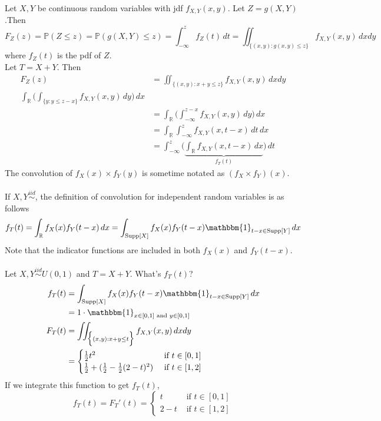 \documentclass[12pt]{article}
\newcommand{\prob}[1]{\mathbb{P}(#1)}
\newcommand{\indicator}[1]{\mathbbm{1}_{#1}}
\newcommand{\iid}{\stackrel{iid}{\sim}}
\newcommand{\set}[1]{\Big\{ #1 \Big\}}
\begin{document}
Let $X, Y$ be continuous random variables with jdf $f_{X, Y}(x,y)$. Let $Z = g(X, Y)$ .Then 
$$F_Z(z) = \prob{Z \leq z} = \prob{g(X, Y) \leq z} = \int_{-\infty}^z f_Z(t) \, dt = \iint_{\set{(x, y) : g(x, y) \leq z}} f_{X, Y}(x, y) \, dxdy $$ where $f_Z(t)$ is the pdf of $Z$. \\ Let $T = X + Y$. Then $$\begin{aligned} F_Z(z) &= \iint_{\set{(x, y): x + y \leq z}} f_{X, Y}(x, y) \, dxdy \\ \int_{\mathbb{R}} \Big( \int_{\set{y: y \leq z -x}} f_{X, Y} (x, y) \, dy\Big) \, dx \\ &= \int_{\mathbb{R}} \Big( \int_{-\infty}^{z - x} f_{X, Y} (x, y) \, dy\Big) \, dx \\ &= \int_{\mathbb{R}} \int_{-\infty}^z f_{X, Y}(x, t - x) \, dt \, dx \\ &= \int_{-\infty}^z \Big( \underbrace{\int_{\mathbb{R}} f_{X, Y} (x, t - x) \, dx}_{f_T(t)}\Big) \, dt \end{aligned} $$ The convolution of $f_X(x) \times f_Y(y)$ is sometime notated as $(f_X \times f_Y)(x)$. \\~\\
If $X, Y \iid$, the definition of convolution for independent random variables is as follows $$f_T(t) = \int_{\mathbb{R}} f_X(x)f_Y(t -x) \, dx = \int_{\text{Supp}[X]} f_X(x)f_Y(t - x) \indicator{t - x \in \text{Supp}[Y]} \, dx $$ Note that the indicator functions are included in both $f_X(x)$ and $f_Y(t - x)$. \\~\\
Let $X, Y \iid U(0, 1)$ and $T = X + Y$. What's $f_T(t)$? $$\begin{aligned} f_T(t) &= \int_{\text{Supp}[X]} f_X(x)f_Y(t - x) \indicator{t - x \in \text{Supp}[Y]} \, dx \\ &= 1 \cdot \indicator{x \in [0, 1] \text{ and } y \in [0, 1]} \\ F_T(t) &= \iint_{\set{(x, y): x + y \leq t}} f_{X, Y} (x, y)\, dxdy \\ &= \begin{cases} \frac{1}{2}t^2 &\text{ if } t \in [0, 1] \\ \frac{1}{2}  + (\frac{1}{2} - \frac{1}{2}(2 - t)^2) &\text{ if } t \in [1,2] \end{cases} \end{aligned} $$ If we integrate this function to get $f_T(t)$, $$f_T(t) = F_T'(t) = \begin{cases} t &\text{ if } t \in [0, 1] \\ 2 - t &\text{ if } t \in [1, 2] \end{cases} $$ 
\end{document}
